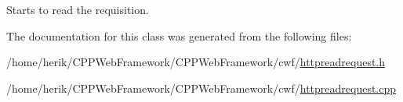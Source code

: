 Starts to read the requisition. 



The documentation for this class was generated from the following files\+:\begin{DoxyCompactItemize}
\item 
/home/herik/\+C\+P\+P\+Web\+Framework/\+C\+P\+P\+Web\+Framework/cwf/\hyperlink{httpreadrequest_8h}{httpreadrequest.\+h}\item 
/home/herik/\+C\+P\+P\+Web\+Framework/\+C\+P\+P\+Web\+Framework/cwf/\hyperlink{httpreadrequest_8cpp}{httpreadrequest.\+cpp}\end{DoxyCompactItemize}
